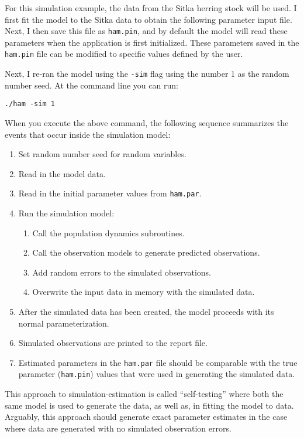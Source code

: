 \documentclass[12pt,letterpaper]{article}
\begin{document}
  For this simulation example, the data from the Sitka herring stock will be used. I first fit the model to the Sitka data to obtain the following parameter input file. Next, I then save this file as \texttt{ham.pin}, and by default the model will read these parameters when the application is first initialized. These parameters saved in the \texttt{ham.pin} file can be modified to specific values defined by the user.  

  

  Next, I re-ran the model using the \texttt{-sim} flag using the number 1 as the random number seed.  At the command line you can run:

  \texttt{./ham -sim 1}

  When you execute the above command, the following sequence summarizes the events that occur inside the simulation model:
  \begin{enumerate}
    \item Set random number seed for random variables.
    \item Read in the model data.
    \item Read in the initial parameter values from \texttt{ham.par}.
      \item Run the simulation model:
    \begin{enumerate}
    \item Call the population dynamics subroutines.
    \item Call the observation models to generate predicted observations.
    \item Add random errors to the simulated observations.
    \item Overwrite the input data in memory with the simulated data.
    \end{enumerate}
    \item After the simulated data has been created, the model proceeds with its normal parameterization.
    \item Simulated observations are printed to the report file. 
    \item Estimated parameters in the \texttt{ham.par} file should be comparable with the true parameter (\texttt{ham.pin}) values that were used in generating the simulated data.
  \end{enumerate}

  This approach to simulation-estimation is called ``self-testing'' where both the same model is used to generate the data, as well as, in fitting the model to data. Arguably, this approach should generate exact parameter estimates in the case where data are generated with no simulated observation errors.
\end{document}
